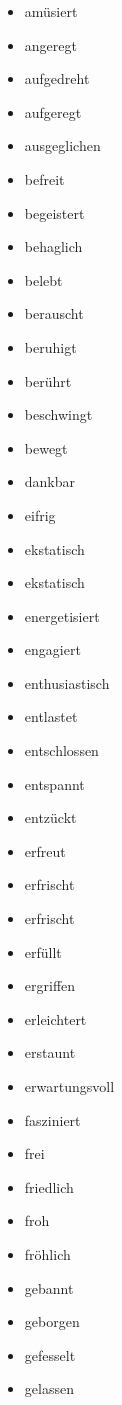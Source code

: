 \begin{multicols}{2}
  \begin{itemize}
    \item amüsiert
    \item angeregt
    \item aufgedreht
    \item aufgeregt
    \item ausgeglichen
    \item befreit
    \item begeistert
    \item behaglich
    \item belebt
    \item berauscht
    \item beruhigt
    \item berührt
    \item beschwingt
    \item bewegt
    \item dankbar
    \item eifrig
    \item ekstatisch
    \item ekstatisch
    \item energetisiert
    \item engagiert
    \item enthusiastisch
    \item entlastet
    \item entschlossen
    \item entspannt
    \item entzückt
    \item erfreut
    \item erfrischt
    \item erfrischt
    \item erfüllt
    \item ergriffen
    \item erleichtert
    \item erstaunt
    \item erwartungsvoll
    \item fasziniert
    \item frei
    \item friedlich
    \item froh
    \item fröhlich
    \item gebannt
    \item geborgen
    \item gefesselt
    \item gelassen

\end{itemize}
\end{multicols}
